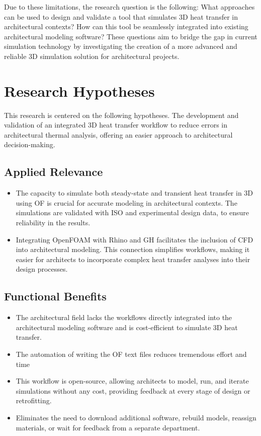 Due to these limitations, the research question is the following: What approaches can be used to design and validate a tool that simulates 3D heat transfer in architectural contexts? How can this tool be seamlessly integrated into existing architectural modeling software? These questions aim to bridge the gap in current simulation technology by investigating the creation of a more advanced and reliable 3D simulation solution for architectural projects.

\section{Research Hypotheses}
This research is centered on the following hypotheses.
The development and validation of an integrated 3D heat transfer workflow to reduce errors in architectural thermal analysis, offering an easier approach to architectural decision-making.

\subsection{Applied Relevance}
\begin{itemize}
    \item The capacity to simulate both steady-state and transient heat transfer in \gls{3D} using \gls{OF} is crucial for accurate modeling in architectural contexts. The simulations are validated with \gls{ISO} and experimental design data, to ensure reliability in the results.
    \item Integrating OpenFOAM with Rhino and \gls{GH} facilitates the inclusion of \gls{CFD} into architectural modeling. This connection simplifies workflows, making it easier for architects to incorporate complex heat transfer analyses into their design processes.
\end{itemize}

\subsection{Functional Benefits}
\begin{itemize}
    \item The architectural field lacks the workflows directly integrated into the architectural modeling software and is cost-efficient to simulate \gls{3D} heat transfer.
    \item The automation of writing the OF text files reduces tremendous effort and time
    \item This workflow is open-source, allowing architects to model, run, and iterate simulations without any cost, providing feedback at every stage of design or retrofitting.

    \item Eliminates the need to download additional software, rebuild models, reassign materials, or wait for feedback from a separate department.
\end{itemize}

